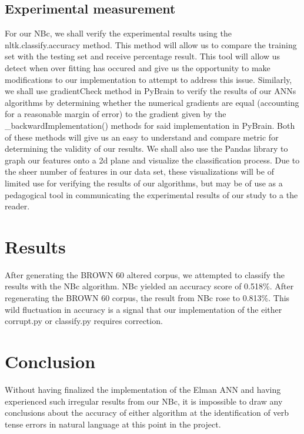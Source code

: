\documentclass{article}
\begin{document}
\subsection{Experimental measurement}
For our NBc, we shall verify the experimental results using the nltk.classify.accuracy method. This method will allow us to compare the training set with the testing set and receive percentage result. This tool will allow us detect when over fitting has occured and give us the opportunity to make modifications to our implementation to attempt to address this issue. Similarly, we shall use gradientCheck method in PyBrain to verify the results of our ANNs algorithms by determining whether the numerical gradients are  equal (accounting for a reasonable margin of error) to the gradient given by the \_backwardImplementation() methods for said implementation in PyBrain. Both of these methods will give us an easy to understand and compare metric for determining the validity of our results. We shall also use the Pandas library to graph our features onto a 2d plane and visualize the classification process. Due to the sheer number of features in our data set, these visualizations will be of limited use for verifying the results of our algorithms, but may be of use as a pedagogical tool in communicating the experimental results of our study to a the reader. 
\section{Results}
After generating the BROWN 60 altered corpus, we attempted to classify the results with the NBc algorithm. NBc yielded an accuracy score of 0.518\%. After regenerating the BROWN 60 corpus, the result from NBc rose to 0.813\%. This wild fluctuation in accuracy is a signal that our implementation of the either corrupt.py or classify.py requires correction.
\section{Conclusion}
Without having finalized the implementation of the Elman ANN and having experienced such irregular results from our NBc, it is impossible to draw any conclusions about the accuracy of either algorithm at the identification of verb tense errors in natural language at this point in the project.



\end{document}
